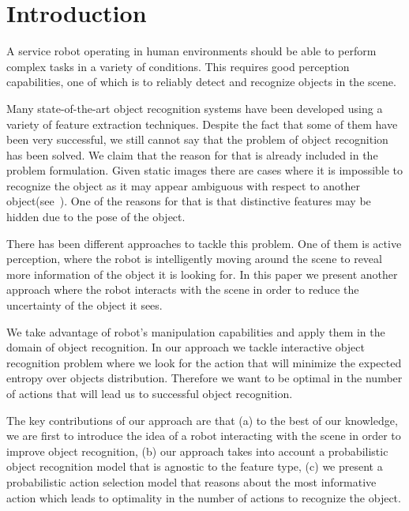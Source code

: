 \section{Introduction}


	A service robot operating in human environments should be able to perform complex tasks in a variety of conditions. This requires good perception capabilities, one of which is to reliably detect and recognize objects in the scene.

    Many state-of-the-art object recognition systems have been developed using a variety of feature extraction techniques. Despite the fact that some of them have been very successful, we still cannot say that the problem of object recognition has been solved. We claim that the reason for that is already included in the problem formulation. Given static images there are cases where it is impossible to recognize the object as it may appear ambiguous with respect to another object(see~). One of the reasons for that is that distinctive features may be hidden due to the pose of the object. 
    
There has been different approaches to tackle this problem. One of them is active perception, where the robot is intelligently moving around the scene to reveal more information of the object it is looking for. In this paper we present another approach where the robot interacts with the scene in order to reduce the uncertainty of the object it sees.
    
    We take advantage of robot's manipulation capabilities and apply them in the domain of object recognition. In our approach we tackle interactive object recognition problem where we look for the action that will minimize the expected entropy over objects distribution. Therefore we want to be optimal in the number of actions that will lead us to successful object recognition.

    The key contributions of our approach are that (a) to the best of our knowledge, we are first to introduce the idea of a robot interacting with the scene in order to improve object recognition, (b) our approach takes into account a probabilistic object recognition model that is agnostic to the feature type, (c) we present a probabilistic action selection model that reasons about the most informative action which leads to optimality in the number of actions to recognize the object.

